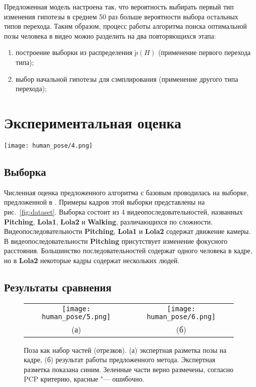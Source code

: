 Предложенная модель настроена так, что вероятность выбирать первый тип изменения гипотезы в среднем 50 раз больше вероятности выбора остальных типов перехода. Таким образом, процесс работы алгоритма поиска оптимальной позы человека в видео можно разделить на два повторяющихся этапа:
\begin{enumerate}
	\item построение выборки из распределения $\tilde{p}(H)$ (применение первого перехода типа);
	\item выбор начальной гипотезы для сэмплирования (применение другого типа перехода);
\end{enumerate}

\section{Экспериментальная оценка}

\begin{figure*}[t]
	\begin{center}
		\texttt{[image: human\_pose/4.png]}
		\caption{Пример кадров из выборки. Последовательности Walking, Pitching, Lola1, Lola2, соответственно.}
		\label{fig:dataset}
	\end{center}
\end{figure*}

\subsection{Выборка}

Численная оценка предложенного алгоритма с базовым проводилась на выборке, предложенной в \cite{park2011n}. Примеры кадров этой выборки представлены на рис.~\ref{fig:dataset}. Выборка состоит из 4 видеопоследовательностей, названных \textbf{Pitching}, \textbf{Lola1}, \textbf{Lola2} и \textbf{Walking}, различающихся по сложности. Видеопоследовательности \textbf{Pitching}, \textbf{Lola1} и \textbf{Lola2} содержат движение камеры. В видеопоследовательности \textbf{Pitching} присутствует изменение фокусного расстояния. Большинство последовательностей содержат одного человека в кадре, но в \textbf{Lola2} некоторые кадры содержат нескольких людей.

\subsection{Результаты сравнения}


\begin{figure}[t]
	\begin{center}
		\begin{tabular}{cc}
			\texttt{[image: human\_pose/5.png]} & \texttt{[image: human\_pose/6.png]} \\
			(а) & (б)
		\end{tabular}
		\caption{Поза как набор частей (отрезков). (а) экспертная разметка позы на кадре, (б) результат работы предложенного метода. Экспертная разметка показана синим. Зеленные части верно размечены, согласно PCP критерию, красные "--- ошибочно.}
		\label{fig:PCP}
	\end{center}
\end{figure}



